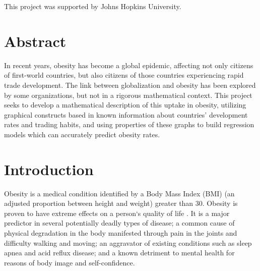 \documentclass[oneside,12pt]{report}
\def\prefacesection#1{
\chapter*{#1}
\addcontentsline{toc}{chapter}{#1}
}
\begin{document}
\vfill  %
\footnoterule
\noindent \small{This project was supported by Johns Hopkins University.}

\prefacesection{Abstract}

In recent years, obesity has become a global epidemic, affecting not only citizens of first-world countries, but also citizens of those countries experiencing rapid trade development. The link between globalization and obesity has been explored by some organizations, but not in a rigorous mathematical context. This project seeks to develop a mathematical description of this uptake in obesity, utilizing graphical constructs based in known information about countries’ development rates and trading habits, and using properties of these graphs to build regression models which can accurately predict obesity rates.


\tableofcontents




\renewcommand{\thefootnote}{\arabic{footnote}}
\setcounter{footnote}{0}

%
%
%
%
%
%

%
%
%
%
%
%

\chapter{Introduction}

Obesity is a medical condition identified by a Body Mass Index (BMI) (an adjusted proportion between height and weight) greater than 30. Obesity is proven to have extreme effects on a person`s quality of life \cite{health}. It is a major predictor in several potentially deadly types of disease; a common cause of physical degradation in the body manifested through pain in the joints and difficulty walking and moving; an aggravator of existing conditions such as sleep apnea and acid reflux disease; and a known detriment to mental health for reasons of body image and self-confidence.
\end{document}
